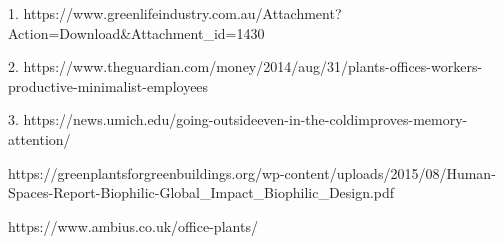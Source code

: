 1. https://www.greenlifeindustry.com.au/Attachment?Action=Download&Attachment_id=1430

2. https://www.theguardian.com/money/2014/aug/31/plants-offices-workers-productive-minimalist-employees

3. https://news.umich.edu/going-outsideeven-in-the-coldimproves-memory-attention/

https://greenplantsforgreenbuildings.org/wp-content/uploads/2015/08/Human-Spaces-Report-Biophilic-Global_Impact_Biophilic_Design.pdf

https://www.ambius.co.uk/office-plants/
